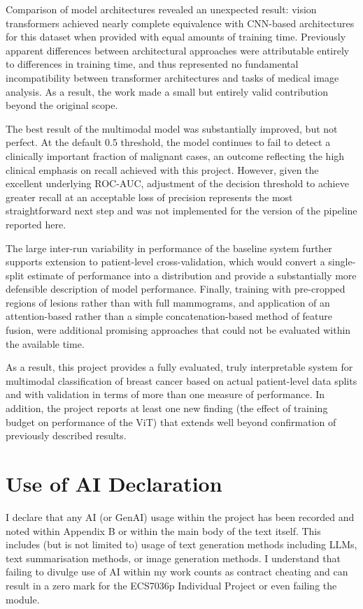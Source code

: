 Comparison of model architectures revealed an unexpected result: vision transformers achieved nearly complete equivalence with CNN-based architectures for this dataset when provided with equal amounts of training time. Previously apparent differences between architectural approaches were attributable entirely to differences in training time, and thus represented no fundamental incompatibility between transformer architectures and tasks of medical image analysis. As a result, the work made a small but entirely valid contribution beyond the original scope.

The best result of the multimodal model was substantially improved, but not perfect. At the default 0.5 threshold, the model continues to fail to detect a clinically important fraction of malignant cases, an outcome reflecting the high clinical emphasis on recall achieved with this project. However, given the excellent underlying ROC-AUC, adjustment of the decision threshold to achieve greater recall at an acceptable loss of precision represents the most straightforward next step and was not implemented for the version of the pipeline reported here.

The large inter-run variability in performance of the baseline system further supports extension to patient-level cross-validation, which would convert a single-split estimate of performance into a distribution and provide a substantially more defensible description of model performance. Finally, training with pre-cropped regions of lesions rather than with full mammograms, and application of an attention-based rather than a simple concatenation-based method of feature fusion, were additional promising approaches that could not be evaluated within the available time.

As a result, this project provides a fully evaluated, truly interpretable system for multimodal classification of breast cancer based on actual patient-level data splits and with validation in terms of more than one measure of performance. In addition, the project reports at least one new finding (the effect of training budget on performance of the ViT) that extends well beyond confirmation of previously described results.

\section{Use of AI Declaration}
I declare that any AI (or GenAI) usage within the project has been recorded and noted within Appendix B or within the main body of the text itself. This includes (but is not limited to) usage of text generation methods including LLMs, text summarisation methods, or image generation methods.
I understand that failing to divulge use of AI within my work counts as contract cheating and can result in a zero mark for the ECS7036p Individual Project or even failing the module.

